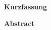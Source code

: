 \newpage
\setcounter{page}{1}

\vspace*{1cm}
\begin{center}
	\textbf{Kurzfassung}
\end{center}

\vspace*{1cm}
\begin{center}
    \textbf{Abstract}
\end{center}



\noindent 